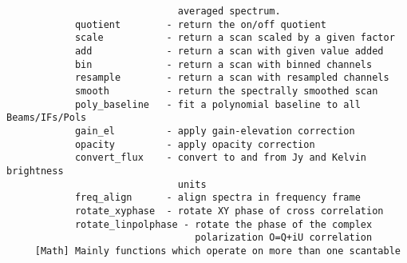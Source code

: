 \documentclass[11pt]{article}
\begin{document}
\begin{verbatim}
                              averaged spectrum.
            quotient        - return the on/off quotient
            scale           - return a scan scaled by a given factor
            add             - return a scan with given value added 
            bin             - return a scan with binned channels
            resample        - return a scan with resampled channels
            smooth          - return the spectrally smoothed scan
            poly_baseline   - fit a polynomial baseline to all Beams/IFs/Pols
            gain_el         - apply gain-elevation correction
            opacity         - apply opacity correction
            convert_flux    - convert to and from Jy and Kelvin brightness
                              units
            freq_align      - align spectra in frequency frame
            rotate_xyphase  - rotate XY phase of cross correlation
            rotate_linpolphase - rotate the phase of the complex
                                 polarization O=Q+iU correlation
     [Math] Mainly functions which operate on more than one scantable


\end{verbatim}
\end{document}
